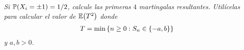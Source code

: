 \emph{
	Si $\mathbb{P}\! \left( X_i=\pm 1 \right)=1/2$, calcule las primeras $4$ martingalas resultantes.
    Util\'icelas para calcular el valor de $\mathbb{E}\! \left( T^2 \right)$ donde
    \null
	\begin{align}
		T=\min\left\{ n\geq 0: S_n\in\left\{ -a,b\right\} \right\} 
	\end{align}
    \null
    y $a,b>0$.
}

\afterstatement\pn